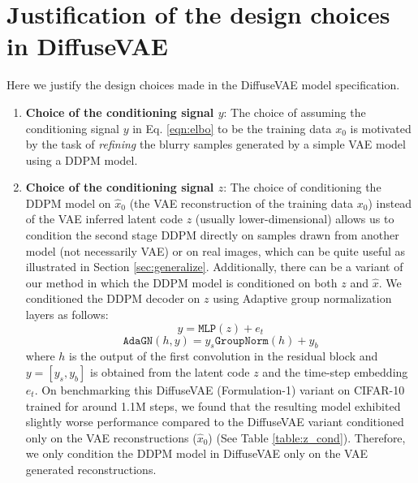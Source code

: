 \documentclass[10pt]{article} \usepackage[accepted]{tmlr}
\begin{document}
\section{Justification of the design choices in DiffuseVAE}
\label{app:appendix_d}
Here we justify the design choices made in the DiffuseVAE model specification.
\begin{enumerate}
    \item \textbf{Choice of the conditioning signal $y$}: The choice of assuming the conditioning signal $y$ in Eq. \ref{eqn:elbo} to be the training data $x_0$ is motivated by the task of \textit{refining} the blurry samples generated by a simple VAE model using a DDPM model.
    
    \item \textbf{Choice of the conditioning signal $z$}: The choice of conditioning the DDPM model on $\hat{x}_0$ (the VAE reconstruction of the training data $x_0$) instead of the VAE inferred latent code $z$ (usually lower-dimensional) allows us to condition the second stage DDPM directly on samples drawn from another model (not necessarily VAE) or on real images, which can be quite useful as illustrated in Section \ref{sec:generalize}. Additionally, there can be a variant of our method in which the DDPM model is conditioned on both $z$ and $\hat{x}$. We conditioned the DDPM decoder on $z$ using Adaptive group normalization layers \citep{dhariwal2021diffusion, https://doi.org/10.48550/arxiv.1803.08494} as follows:
    \begin{equation}
        y = \texttt{MLP}(z) + e_t
    \end{equation}
    \begin{equation}
        \texttt{AdaGN}(h, y) = y_s \texttt{GroupNorm}(h) + y_b
    \end{equation}
    where $h$ is the output of the first convolution in the residual block and $y = [y_s, y_b]$ is obtained from the latent code $z$ and the time-step embedding $e_t$.
    On benchmarking this DiffuseVAE (Formulation-1) variant on CIFAR-10 trained for around 1.1M steps, we found that the resulting model exhibited slightly worse performance compared to the DiffuseVAE variant conditioned only on the VAE reconstructions ($\hat{x}_0$) (See Table \ref{table:z_cond}). Therefore, we only condition the DDPM model in DiffuseVAE only on the VAE generated reconstructions.


\end{enumerate}
\end{document}
